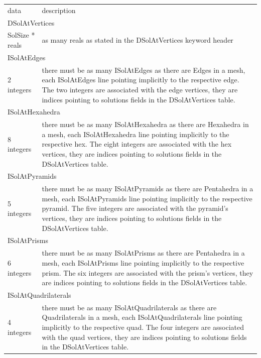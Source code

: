 \documentclass[a4paper,12pt]{article}
\begin{document}
\setlongtables
\begin{longtable}{|m{4cm}|m{11cm}|}
\endhead
\endfoot

\hline
\multicolumn{2}{|l|}{keyword} \\
\hline
data & description \\
\hline\hline

\multicolumn{2}{|l|}{DSolAtVertices} \\
\hline
SolSize * reals & as many reals as stated in the DSolAtVertices keyword header \\
\hline\hline

\multicolumn{2}{|l|}{ISolAtEdges} \\
\hline
2 integers & there must be as many ISolAtEdges as there are Edges in a mesh, each ISolAtEdges line pointing implicitly to the respective edge. The two integers are associated with the edge vertices, they are indices pointing to solutions fields in the DSolAtVertices table. \\
\hline\hline

\multicolumn{2}{|l|}{ISolAtHexahedra} \\
\hline
8 integers & there must be as many ISolAtHexahedra as there are Hexahedra in a mesh, each ISolAtHexahedra line pointing implicitly to the respective hex. The eight integers are associated with the hex vertices, they are indices pointing to solutions fields in the DSolAtVertices table. \\
\hline\hline

\multicolumn{2}{|l|}{ISolAtPyramids} \\
\hline
5 integers & there must be as many ISolAtPyramids as there are Pentahedra in a mesh, each ISolAtPyramids line pointing implicitly to the respective pyramid. The five integers are associated with the pyramid's vertices, they are indices pointing to solutions fields in the DSolAtVertices table. \\
\hline\hline

\multicolumn{2}{|l|}{ISolAtPrisms} \\
\hline
6 integers & there must be as many ISolAtPrisms as there are Pentahedra in a mesh, each ISolAtPrisms line pointing implicitly to the respective prism. The six integers are associated with the prism's vertices, they are indices pointing to solutions fields in the DSolAtVertices table. \\
\hline\hline

\multicolumn{2}{|l|}{ISolAtQuadrilaterals} \\
\hline
4 integers & there must be as many ISolAtQuadrilaterals as there are Quadrilaterals in a mesh, each ISolAtQuadrilaterals line pointing implicitly to the respective quad. The four integers are associated with the quad vertices, they are indices pointing to solutions fields in the DSolAtVertices table. \\
\hline\hline


\end{longtable}
\end{document}
